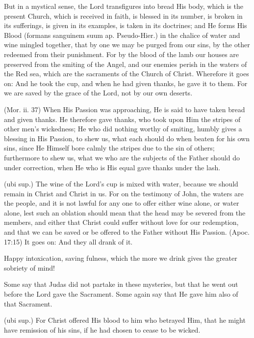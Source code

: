  But in a mystical sense, the Lord transfigures into bread His body, which is the present Church, which is received in faith, is blessed in its number, is broken in its sufferings, is given in its examples, is taken in its doctrines; and He forms His Blood (formans sanguinem suum ap. Pseudo-Hier.) in the chalice of water and wine mingled together, that by one we may be purged from our sins, by the other redeemed from their punishment. For by the blood of the lamb our houses are preserved from the smiting of the Angel, and our enemies perish in the waters of the Red sea, which are the sacraments of the Church of Christ. Wherefore it goes on: And he took the cup, and when he had given thanks, he gave it to them. For we are saved by the grace of the Lord, not by our own deserts.

 (Mor. ii. 37) When His Passion was approaching, He is said to have taken bread and given thanks. He therefore gave thanks, who took upon Him the stripes of other men’s wickedness; He who did nothing worthy of smiting, humbly gives a blessing in His Passion, to shew us, what each should do when beaten for his own sins, since He Himself bore calmly the stripes due to the sin of others; furthermore to shew us, what we who are the subjects of the Father should do under correction, when He who is His equal gave thanks under the lash.

 (ubi sup.) The wine of the Lord’s cup is mixed with water, because we should remain in Christ and Christ in us. For on the testimony of John, the waters are the people, and it is not lawful for any one to offer either wine alone, or water alone, lest such an oblation should mean that the head may be severed from the members, and either that Christ could suffer without love for our redemption, and that we can be saved or be offered to the Father without His Passion. (Apoc. 17:15) It goes on: And they all drank of it.

 Happy intoxication, saving fulness, which the more we drink gives the greater sobriety of mind!

 Some say that Judas did not partake in these mysteries, but that he went out before the Lord gave the Sacrament. Some again say that He gave him also of that Sacrament.

 (ubi sup.) For Christ offered His blood to him who betrayed Him, that he might have remission of his sins, if he had chosen to cease to be wicked.

